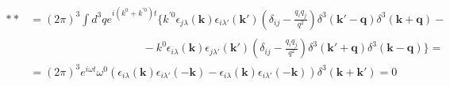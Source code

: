 \documentclass[twoside]{amsart}
\begin{document}
\[
\begin{aligned}
  ** & = (2\pi)^3 \int d^3q e^{i(k^0 + k^{'0}) t} \lbrace k^{'0} \epsilon_{j\lambda}(\mathbf{k}) \epsilon_{i\lambda'}(\mathbf{k}') \left( \delta_{ij}  - \frac{ q_i q_j}{q^2} \right) \delta^3(\mathbf{k}' - \mathbf{q}) \delta^3(\mathbf{k} + \mathbf{q}) - \\
  & \phantom{ (2\pi)^3 \int d^3q e^{i(k^0 + k^{'0}) t} } - k^0 \epsilon_{i\lambda}(\mathbf{k}) \epsilon_{j\lambda'}(\mathbf{k}') \left( \delta_{ij} - \frac{q_i q_j}{q^2} \right) \delta^3(\mathbf{k}' + \mathbf{q} )\delta^3(\mathbf{k}-\mathbf{q}) \rbrace =  \\
  & = (2\pi)^3 e^{i\omega t} \omega^0 \left( \epsilon_{i\lambda}(\mathbf{k}) \epsilon_{i\lambda'}( - \mathbf{k}) - \epsilon_{i\lambda}(\mathbf{k}) \epsilon_{i\lambda'}(-\mathbf{k}) \right) \delta^3(\mathbf{k} + \mathbf{k}') = 0  
\end{aligned}
\]

\hrulefill
\end{document}
